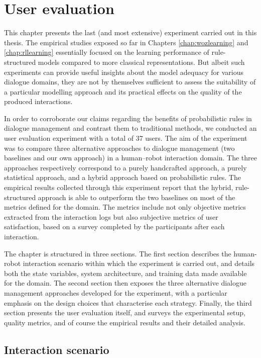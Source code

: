 \chapter{User evaluation}
\label{chap:user-evaluation}

This chapter presents the last (and most extensive) experiment carried out in this thesis. The empirical studies exposed so far in Chapters \ref{chap:wozlearning} and \ref{chap:rllearning} essentially focused on the learning performance of rule-structured models compared to more classical representations. But albeit such experiments can provide useful insights about the model adequacy for various dialogue domains, they are not by themselves sufficient to assess the suitability of a particular modelling approach and its practical effects on the quality of the produced interactions. 

In order to corroborate our claims regarding the benefits of probabilistic rules in dialogue management and contrast them to traditional methods, we conducted an user evaluation experiment with a total of 37 users. The aim of the experiment was to compare three alternative approaches to dialogue management (two baselines and our own approach) in a human--robot interaction domain.  The three approaches respectively correspond to a purely handcrafted approach, a purely statistical approach, and a hybrid approach based on probabilistic rules. The empirical results collected through this experiment report that the  hybrid, rule-structured approach is able to outperform the two baselines on most of the metrics defined for the domain.  The metrics include not only objective metrics extracted from the interaction logs but also subjective metrics of user satisfaction, based on a survey completed by the participants after each interaction. 


The chapter is structured in three sections.  The first section describes the human-robot interaction scenario within which the experiment is carried out, and details both the state variables, system architecture, and training data made available for the domain. The second section then exposes the three alternative dialogue management approaches developed for the experiment, with a particular emphasis on the design choices that characterise each strategy.   Finally, the third section presents the user evaluation itself, and surveys the experimental setup, quality metrics, and of course the empirical results and their detailed analysis. 

\section{Interaction scenario}

